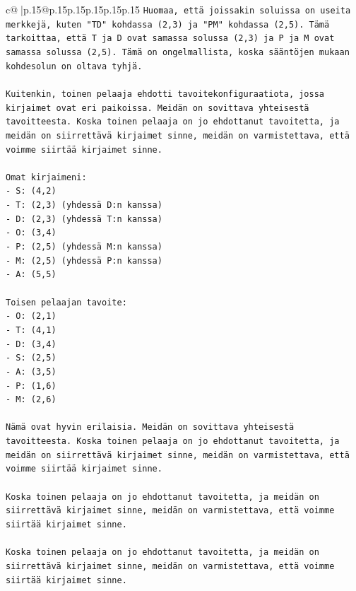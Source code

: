 \documentclass{article}
\begin{document}
{\begin{supertabular}{c@{$\;$}|p{.15\linewidth}@{}p{.15\linewidth}p{.15\linewidth}p{.15\linewidth}p{.15\linewidth}p{.15\linewidth}}
{{{\texttt{Huomaa, että joissakin soluissa on useita merkkejä, kuten "TD" kohdassa (2,3) ja "PM" kohdassa (2,5). Tämä tarkoittaa, että T ja D ovat samassa solussa (2,3) ja P ja M ovat samassa solussa (2,5). Tämä on ongelmallista, koska sääntöjen mukaan kohdesolun on oltava tyhjä.} \\
\\ 
\texttt{Kuitenkin, toinen pelaaja ehdotti tavoitekonfiguraatiota, jossa kirjaimet ovat eri paikoissa. Meidän on sovittava yhteisestä tavoitteesta. Koska toinen pelaaja on jo ehdottanut tavoitetta, ja meidän on siirrettävä kirjaimet sinne, meidän on varmistettava, että voimme siirtää kirjaimet sinne.} \\
\\ 
\texttt{Omat kirjaimeni:} \\
\texttt{{-} S: (4,2)} \\
\texttt{{-} T: (2,3) (yhdessä D:n kanssa)} \\
\texttt{{-} D: (2,3) (yhdessä T:n kanssa)} \\
\texttt{{-} O: (3,4)} \\
\texttt{{-} P: (2,5) (yhdessä M:n kanssa)} \\
\texttt{{-} M: (2,5) (yhdessä P:n kanssa)} \\
\texttt{{-} A: (5,5)} \\
\\ 
\texttt{Toisen pelaajan tavoite:} \\
\texttt{{-} O: (2,1)} \\
\texttt{{-} T: (4,1)} \\
\texttt{{-} D: (3,4)} \\
\texttt{{-} S: (2,5)} \\
\texttt{{-} A: (3,5)} \\
\texttt{{-} P: (1,6)} \\
\texttt{{-} M: (2,6)} \\
\\ 
\texttt{Nämä ovat hyvin erilaisia. Meidän on sovittava yhteisestä tavoitteesta. Koska toinen pelaaja on jo ehdottanut tavoitetta, ja meidän on siirrettävä kirjaimet sinne, meidän on varmistettava, että voimme siirtää kirjaimet sinne.} \\
\\ 
\texttt{Koska toinen pelaaja on jo ehdottanut tavoitetta, ja meidän on siirrettävä kirjaimet sinne, meidän on varmistettava, että voimme siirtää kirjaimet sinne.} \\
\\ 
\texttt{Koska toinen pelaaja on jo ehdottanut tavoitetta, ja meidän on siirrettävä kirjaimet sinne, meidän on varmistettava, että voimme siirtää kirjaimet sinne.} \\
}}}
\end{supertabular}}
\end{document}

